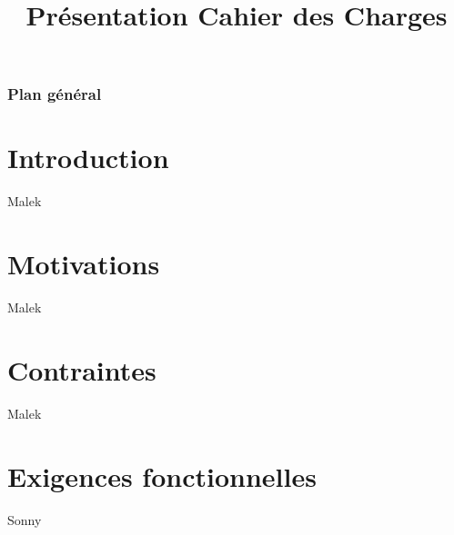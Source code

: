 
\usepackage{../tex/myInfolines}
\title{Présentation Cahier des Charges}



	\begin{frame}
		\titlepage
	\end{frame}
	
	\begin{frame}
		\frametitle{Plan général}
		\tableofcontents
	\end{frame}
	
	\section{Introduction}
	\begin{frame}
		Malek
	\end{frame}
	
	\section{Motivations}
	\begin{frame}
		Malek
	\end{frame}	
	
	\section{Contraintes}
	\begin{frame}
		Malek
	\end{frame}
	
	\section{Exigences fonctionnelles}
	\begin{frame}
		Sonny
	\end{frame}
	
